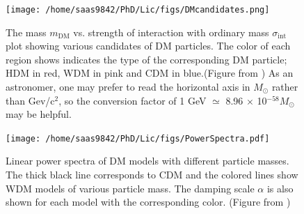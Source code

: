 \documentclass[a4wide,12pt]{book}
\begin{document}
\begin{itemize}
  \end{itemize}

\begin{figure}
\centering
\texttt{[image: /home/saas9842/PhD/Lic/figs/DMcandidates.png]} %
\caption{The mass $m_\mathrm{DM}$ vs. strength of interaction with ordinary mass $\sigma_\mathrm{int}$ plot showing various candidates of DM particles. The color of each region shows indicates the type of the corresponding DM particle; HDM in red, WDM in pink and CDM in blue.(Figure from \citealt[][]{Baer+2015}) As an astronomer, one may prefer to read the horizontal axis in $M_\odot$ rather than Gev/c$^2$, so the conversion factor of 1 GeV $\simeq$ 8.96 $\times$ 10$^{-58} M_\odot$ may be helpful.}
\label{fig:DMcandidates}
\end{figure}

\begin{figure}
\centering
\texttt{[image: /home/saas9842/PhD/Lic/figs/PowerSpectra.pdf]} %
\caption{Linear power spectra of DM models with different particle masses. The thick black line corresponds to CDM and the colored lines show WDM models of various particle mass. The damping scale $\alpha$ is also shown for each model with the corresponding color. (Figure from \citealt[][]{Kennedy+2014})}
\label{fig:CDM_WDM_PS}
\end{figure}


\end{document}
